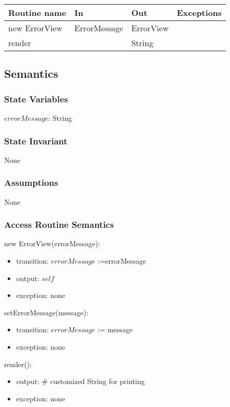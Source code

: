 \documentclass[12pt]{article}
\begin{document}
\begin{tabular}{| l | l | l | p{5cm} |}
\hline
\textbf{Routine name} & \textbf{In} & \textbf{Out} & \textbf{Exceptions}\\
\hline
new ErrorView & ErrorMessage & ErrorView & \\
\hline
render &  & String&\\
\hline
\end{tabular}

\subsection* {Semantics}

\subsubsection* {State Variables}

$errorMessage$: String

\subsubsection* {State Invariant}

None

\subsubsection* {Assumptions}

None

\subsubsection* {Access Routine Semantics}
new ErrorView(errorMessage):
\begin{itemize}
\item transition: $errorMessage$ :=errorMessage
\item output: $self$
\item exception: none
\end{itemize}
setErrorMessage(message):
\begin{itemize}
\item transition: $errorMessage$ := message
\item exception: none
\end{itemize}
render():
\begin{itemize}
\item output: \# customized String for printing
\item exception: none
\end{itemize}
\end{document}
